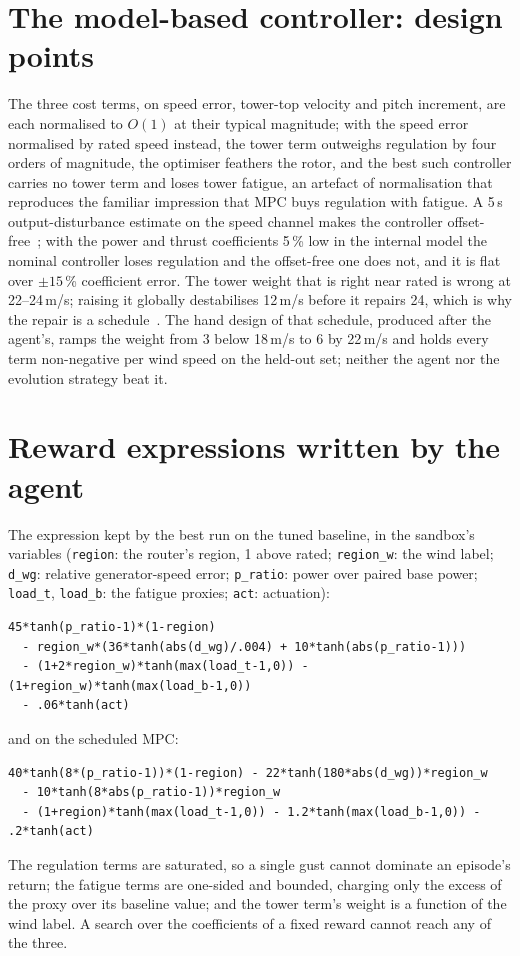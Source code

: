 \documentclass{article}
\begin{document}
\section{The model-based controller: design points}
\label{app:mpc}
The three cost terms, on speed error, tower-top velocity and pitch increment, are each normalised to $O(1)$ at their typical magnitude; with the speed error normalised by rated speed instead, the tower term outweighs regulation by four orders of magnitude, the optimiser feathers the rotor, and the best such controller carries no tower term and loses tower fatigue, an artefact of normalisation that reproduces the familiar impression that MPC buys regulation with fatigue. A 5\,s output-disturbance estimate on the speed channel makes the controller offset-free~\citep{Liu2024offsetfree}; with the power and thrust coefficients 5\,\% low in the internal model the nominal controller loses regulation and the offset-free one does not, and it is flat over $\pm15$\,\% coefficient error. The tower weight that is right near rated is wrong at 22--24\,m/s; raising it globally destabilises 12\,m/s before it repairs 24, which is why the repair is a schedule~\citep{Wintermeyer2021weightsched}. The hand design of that schedule, produced after the agent's, ramps the weight from 3 below 18\,m/s to 6 by 22\,m/s and holds every term non-negative per wind speed on the held-out set; neither the agent nor the evolution strategy beat it.

\section{Reward expressions written by the agent}
\label{app:rewards}
The expression kept by the best run on the tuned baseline, in the sandbox's variables (\texttt{region}: the router's region, 1 above rated; \texttt{region\_w}: the wind label; \texttt{d\_wg}: relative generator-speed error; \texttt{p\_ratio}: power over paired base power; \texttt{load\_t}, \texttt{load\_b}: the fatigue proxies; \texttt{act}: actuation):
\begin{footnotesize}\begin{verbatim}
45*tanh(p_ratio-1)*(1-region)
  - region_w*(36*tanh(abs(d_wg)/.004) + 10*tanh(abs(p_ratio-1)))
  - (1+2*region_w)*tanh(max(load_t-1,0)) - (1+region_w)*tanh(max(load_b-1,0))
  - .06*tanh(act)
\end{verbatim}\end{footnotesize}
and on the scheduled MPC:
\begin{footnotesize}\begin{verbatim}
40*tanh(8*(p_ratio-1))*(1-region) - 22*tanh(180*abs(d_wg))*region_w
  - 10*tanh(8*abs(p_ratio-1))*region_w
  - (1+region)*tanh(max(load_t-1,0)) - 1.2*tanh(max(load_b-1,0)) - .2*tanh(act)
\end{verbatim}\end{footnotesize}
The regulation terms are saturated, so a single gust cannot dominate an episode's return; the fatigue terms are one-sided and bounded, charging only the excess of the proxy over its baseline value; and the tower term's weight is a function of the wind label. A search over the coefficients of a fixed reward cannot reach any of the three.
\end{document}
